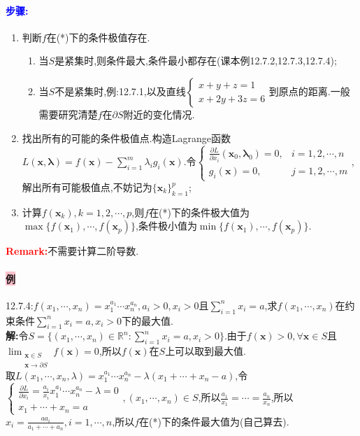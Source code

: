 \documentclass[UTF8]{ctexart}
\newcommand{\p}[2]{\frac{\partial #1}{\partial #2}}
\newcommand{\x}{\boldsymbol{x}}
\begin{document}
    \paragraph{\textcolor{blue}{步骤:}}
    \begin{enumerate}[{Step }1:]
        \item 判断$f$在(*)下的条件极值存在.
        \begin{enumerate}[{Case }1]
            \item 当$S$是紧集时,则条件最大,条件最小都存在(课本例12.7.2,12.7.3,12.7.4);
            \item 当$S$不是紧集时,例:12.7.1,以及直线$\begin{cases}
                x+y+z=1\\
                x+2y+3z=6
            \end{cases}$到原点的距离.一般需要研究清楚$f$在$\partial S$附近的变化情况.
        \end{enumerate}
        \item 找出所有的可能的条件极值点.构造Lagrange函数$L(\x,\boldsymbol{\lambda})=f(\x)-\sum_{i=1}^m\lambda_ig_i(\x)$.令$\begin{cases}
            \p{L}{x_i}(\x_0,\boldsymbol{\lambda}_0)=0,&i=1,2,\cdots,n\\
            g_i(\x)=0,&j=1,2,\cdots,m
        \end{cases}$,解出所有可能极值点,不妨记为$\{\x_k\}_{k=1}^p$;
        \item 计算$f(\x_k),k=1,2,\cdots,p$,则$f$在(*)下的条件极大值为$\max\{f(\x_1),\cdots,f(\x_p)\}$,条件极小值为$\min\{f(\x_1),\cdots,f(\x_p)\}$.
    \end{enumerate}
    \textbf{\textcolor{red}{Remark:}}不需要计算二阶导数.

    \paragraph{\colorbox{pink}{例}}12.7.4:$f(x_1,\cdots,x_n)=x_1^{a_1}\cdots x_n^{a_n},a_i>0,x_i>0$且$\sum_{i=1}^nx_i=a$,求$f(x_1,\cdots,x_n)$在约束条件$\sum_{i=1}^nx_i=a,x_i>0$下的最大值.\\
    \textbf{解:}令$S=\{(x_1,\cdots,x_n)\in \mathbb{R}^n:\sum_{i=1}^nx_i=a,x_i>0\}$.由于$f(\x)>0,\forall\x\in S$且$\lim_{\substack{\x\in S\\ \x\to\partial S}}f(\x)=0$,所以$f(\x)$在$S$上可以取到最大值.$取L(x_1,\cdots,x_n,\lambda)=x_1^{a_1}\cdots x_n^{a_n}-\lambda(x_1+\cdots+x_n-a)$,令$\begin{cases}
        \p{L}{x_i}=\frac{a_i}{x_i}x_1^{a_1}\cdots x_n^{a_n}-\lambda=0\\
        x_1+\cdots+x_n=a
    \end{cases},(x_1,\cdots,x_n)\in S$,所以$\frac{a_1}{x_1}=\cdots=\frac{a_n}{x_n}$,所以$x_i=\frac{aa_i}{a_1+\cdots+a_n},i=1,\cdots,n$,所以$f$在(*)下的条件最大值为(自己算去).
\end{document}
